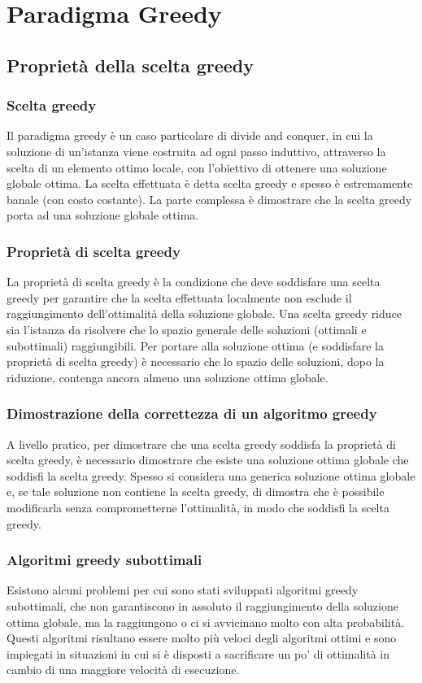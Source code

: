 \section{Paradigma Greedy}
\subsection{Proprietà della scelta greedy}
\subsubsection*{Scelta greedy}
Il paradigma greedy è un caso particolare di divide and conquer, in cui la soluzione di un'istanza viene costruita ad ogni
passo induttivo, attraverso la scelta di un elemento ottimo locale, con l'obiettivo di ottenere una soluzione globale ottima.
La scelta effettuata è detta scelta greedy e spesso è estremamente banale (con costo costante). La parte complessa è
dimostrare che la scelta greedy porta ad una soluzione globale ottima.

\subsubsection*{Proprietà di scelta greedy}
La proprietà di scelta greedy è la condizione che deve soddisfare una scelta greedy per garantire che la scelta effettuata
localmente non esclude il raggiungimento dell'ottimalità della soluzione globale. Una scelta greedy riduce sia l'istanza da
risolvere che lo spazio generale delle soluzioni (ottimali e subottimali) raggiungibili. Per portare alla soluzione ottima
(e soddisfare la proprietà di scelta greedy) è necessario che lo spazio delle soluzioni, dopo la riduzione, contenga ancora
almeno una soluzione ottima globale.

\subsubsection*{Dimostrazione della correttezza di un algoritmo greedy}
A livello pratico, per dimostrare che una scelta greedy soddisfa la proprietà di scelta greedy, è necessario dimostrare
che esiste una soluzione ottima globale che soddisfi la scelta greedy. Spesso si considera una generica soluzione
ottima globale e, se tale soluzione non contiene la scelta greedy, di dimostra che è possibile modificarla senza
comprometterne l'ottimalità, in modo che soddisfi la scelta greedy.

\subsubsection*{Algoritmi greedy subottimali}
Esistono alcuni problemi per cui sono stati sviluppati algoritmi greedy subottimali, che non garantiscono in assoluto il
raggiungimento della soluzione ottima globale, ma la raggiungono o ci si avvicinano molto con alta probabilità. Questi
algoritmi risultano essere molto più veloci degli algoritmi ottimi e sono impiegati in situazioni in cui si è disposti
a sacrificare un po' di ottimalità in cambio di una maggiore velocità di esecuzione.

